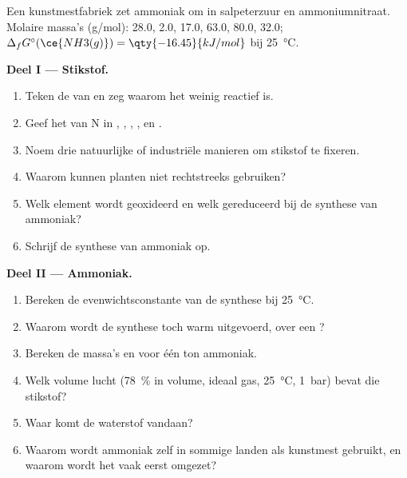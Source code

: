 \begin{problem}
\label{pb:b1:p-block-13-15:1}
Een kunstmestfabriek zet ammoniak om in salpeterzuur en ammoniumnitraat.
Molaire massa's (\unit{g/mol}):  28.0,  2.0, 
17.0,  63.0,  80.0,  32.0;
$\Delta_f G^\circ(\ce{NH3(g)}) = \qty{-16.45}{kJ/mol}$ bij
\qty{25}{\celsius}.

\medskip
\noindent\textbf{Deel I --- Stikstof.}
\begin{enumerate}
  \item Teken de  van  en zeg waarom het weinig
        reactief is.
  \item Geef het  van N in , , ,
        ,  en .
  \item Noem drie natuurlijke of industriële manieren om stikstof te
        fixeren.
  \item Waarom kunnen planten  niet rechtstreeks gebruiken?
  \item Welk element wordt geoxideerd en welk gereduceerd bij de synthese
        van ammoniak?
  \item Schrijf de synthese van ammoniak op.
\end{enumerate}

\medskip
\noindent\textbf{Deel II --- Ammoniak.}
\begin{enumerate}[resume]
  \item Bereken de evenwichtsconstante van de synthese bij
        \qty{25}{\celsius}.
  \item Waarom wordt de synthese toch warm uitgevoerd, over een
        ?
  \item Bereken de massa's  en  voor één ton ammoniak.
  \item Welk volume lucht (\qty{78}{\percent}  in volume, ideaal
        gas, \qty{25}{\celsius}, \qty{1}{bar}) bevat die stikstof?
  \item Waar komt de waterstof vandaan?
  \item Waarom wordt ammoniak zelf in sommige landen als kunstmest
        gebruikt, en waarom wordt het vaak eerst omgezet?
\end{enumerate}


\end{problem}
